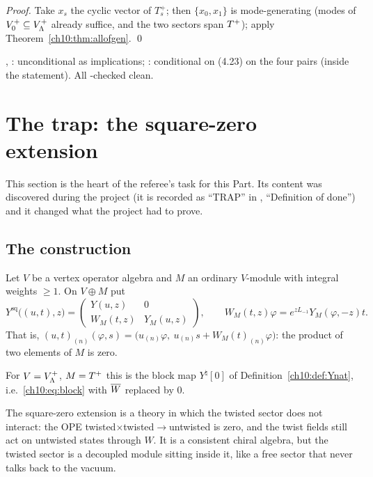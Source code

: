 \emph{Proof.}  Take $x_s$ the cyclic vector of $T_s^+$; then $\{x_0,x_1\}$ is mode-generating
(modes of $V_0^+\subseteq V_{\Lambda}^{+}$ already suffice, and the two sectors span $T^{+}$); apply
Theorem~\ref{ch10:thm:allofgen}. \qed

\begin{status}
, : unconditional as implications;
: conditional on (4.23) on the four pairs (inside the
statement).  All -checked clean.
\end{status}

\section{The trap: the square-zero extension}\label{ch10:sec:trap}

This section is the heart of the referee's task for this Part.  Its content was discovered
during the project (it is recorded as ``TRAP'' in , ``Definition
of done'') and it changed what the project had to prove.

\subsection{The construction}

\begin{definition}\label{ch10:def:sqzero}
Let $V$ be a vertex operator algebra and $M$ an ordinary $V$-module with integral weights $\ge
1$.  On $V\oplus M$ put
\begin{equation*}
 Y^{\mathrm{sq}}\bigl((u,t),z\bigr)=\begin{pmatrix}Y(u,z)&0\\ W_M(t,z)&Y_M(u,z)\end{pmatrix},
 \qquad W_M(t,z)\varphi=e^{zL_{-1}}Y_M(\varphi,-z)t .
\end{equation*}
That is, $(u,t)_{(n)}(\varphi,s)=\bigl(u_{(n)}\varphi,\ u_{(n)}s+W_M(t)_{(n)}\varphi\bigr)$: the product of
two elements of $M$ is zero.
\end{definition}

For $V=V_{\Lambda}^{+}$, $M=T^{+}$ this is the block map $Y^\natural[0]$ of
Definition~\ref{ch10:def:Ynat}, i.e.\ \eqref{ch10:eq:block} with $\overline{W}$ replaced by $0$.

\begin{physics}
The square-zero extension is a theory in which the twisted sector does not interact: the OPE twisted$\times$twisted$\to$untwisted is zero, and the twist fields still act on untwisted states through $W$. It is a consistent chiral algebra, but the twisted sector is a decoupled module sitting inside it, like a free sector that never talks back to the vacuum.
\end{physics}

